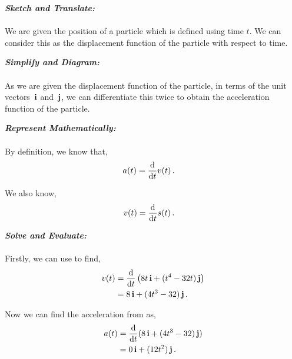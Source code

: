 \begin{subquestions}

\subquestion

\begin{subsubquestions}
	
\subsubquestion

\textbf{\textit{Sketch and Translate:}} \\ \\
 We are given the position of a particle which is defined using time $t$. We can consider this as the displacement function of the particle with respect to time.




\textbf{\textit{Simplify and Diagram:}} \\ \\
As we are given the displacement function of the particle, in terms of the unit vectors $\,\mathbf{i}$ and $\,\mathbf{j}$, we can differentiate this twice to obtain the acceleration function of the particle.



 
\textbf{\textit{Represent Mathematically:}} \\ \\
By definition, we know that,
\begin{align}
	a(t) & = \frac{\mathrm{d}}{\mathrm{d}t}v(t) \label{2009:q6:AEqn2} \,.
\end{align}

We also know,
\begin{align}
	v(t) & = \frac{\mathrm{d}}{\mathrm{d}t}s(t) \label{2009:q6:VEqn2} \,.
\end{align}



\textbf{\textit{Solve and Evaluate:}} \\ \\
Firstly, we can use  to find,
\begin{align}
	v(t) & = \frac{\mathrm{d}}{\mathrm{d}t}\left(8t\,\mathbf{i} + (t^4-32t)\,\mathbf{j}\right) \nonumber \\
	     & = 8\,\mathbf{i} + (4t^3-32)\,\mathbf{j} \,.
\end{align}

Now we can find the acceleration from  as,
\begin{align}
	a(t) & = \frac{\mathrm{d}}{\mathrm{d}t}(8\,\mathbf{i}+(4t^3-32)\,\mathbf{j}) \nonumber \\
	     & = 0\,\mathbf{i} + (12t^2)\,\mathbf{j} \,.
\end{align}


\end{subsubquestions}
\end{subquestions}
